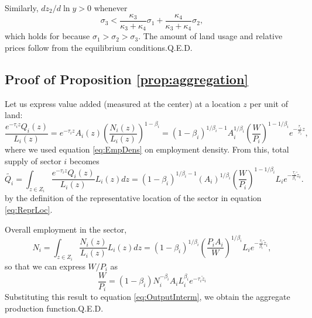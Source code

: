 \documentclass[12pt]{article}
\begin{document}
Similarly, $dz_2/d\ln y>0$ whenever 
\[
\sigma_3 < \frac{\kappa_3}{\kappa_3+\kappa_4}\sigma_1 + \frac{\kappa_4}{\kappa_3+\kappa_4}\sigma_2, 
\]
which holds for because $\sigma_1>\sigma_2>\sigma_3$. The amount of land usage and relative prices follow from the equilibrium conditions.\hfill Q.E.D.
\subsection{Proof of Proposition \ref{prop:aggregation}}
Let us express value added (measured at the center) at a location $z$ per unit of land:
\[
\frac{e^{-\tau_i z} Q_i(z)}{L_i(z)} = e^{-\tau_i z} A_i(z)\left(\frac{N_i(z)}{L_i(z)}\right)^{1-\beta_i} = (1-\beta_i)^{1/\beta_i-1}
A_i^{1/\beta_i}\left(\frac{W}{P_i}\right)^{1-1/\beta_i}
 e^{-\frac{\tau_i}{\beta_i} z},
\]
where we used equation \ref{eq:EmpDens} on employment density. From this, total supply of sector $i$ becomes
\begin{equation}
\label{eq:OutputInterm}
\tilde{Q_i} = \int_{z\in Z_i}\frac{e^{-\tau_i z} Q_i(z)}{L_i(z)}L_i(z)dz=(1-\beta_i)^{1/\beta_i-1}
(A_i)^{1/\beta_i}\left(\frac{W}{P_i}\right)^{1-1/\beta_i} L_i e^{-\frac{\tau_i}{\beta_i} \tilde z_i}.
\end{equation}
by the definition of the representative location of the sector in equation \ref{eq:ReprLoc}.

Overall employment in the sector,
\[
N_i = \int_{z\in Z_i}\frac{N_i(z)}{L_i(z)}L_i(z)dz= (1-\beta_i)^{1/\beta_i}
\left(\frac{P_iA_i}{W}\right)^{1/\beta_i} L_i e^{-\frac{\tau_i}{\beta_i} \tilde z_i},
\]
so that we can express $W/P_i$ as
\[
\frac{W}{P_i} = (1-\beta_i)
N_i^{-\beta_i}A_i L_i^{\beta_i}
 e^{-\tau_i\tilde z_i}
\]
Substituting this result to equation \eqref{eq:OutputInterm}, we obtain the aggregate production function.\hfill Q.E.D.


\end{document}
